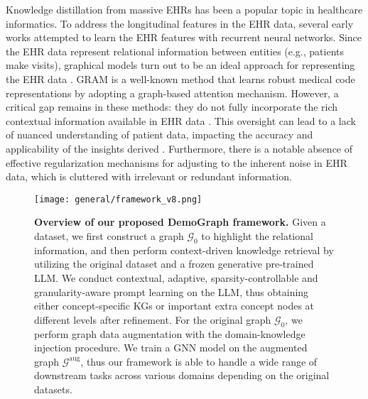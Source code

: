 Knowledge distillation from massive EHRs has been a popular topic in healthcare informatics. 
%
To address the longitudinal features in the EHR data, several early works \citep{ma2017dipole, ma2020concare, ma2020adacare} attempted to learn the EHR features with recurrent neural networks.
%
Since the EHR data represent relational information between entities (e.g., patients make visits), graphical models turn out to be an ideal approach for representing the EHR data \citep{choi2017gram, choi2018mime}.
%
GRAM \citep{choi2017gram} is a well-known method that learns robust medical code representations by adopting a graph-based attention mechanism.
%
However, a critical gap remains in these methods: they do not fully incorporate the rich contextual information available in EHR data \cite{hsu2012context, del2013disseminating}. This oversight can lead to a lack of nuanced understanding of patient data, impacting the accuracy and applicability of the insights derived \cite{evans2016electronic}. 
%
Furthermore, there is a notable absence of effective regularization mechanisms for adjusting to the inherent noise in EHR data, which is cluttered with irrelevant or redundant information.
% 



\begin{figure*}
    \centering
    \texttt{[image: general/framework\_v8.png]}
    \caption{\textbf{Overview of our proposed DemoGraph framework.} \textnormal{Given a dataset, we first construct a 
    graph \( \mathcal{G}_0 \) to highlight the relational information, and
    then perform context-driven knowledge retrieval by utilizing the original dataset and a frozen generative pre-trained LLM. We conduct contextual, adaptive, sparsity-controllable and granularity-aware prompt learning on the LLM, thus obtaining either concept-specific KGs or important extra concept nodes at different levels after refinement. For the original graph \( \mathcal{G}_0 \), we perform graph data augmentation with the domain-knowledge injection procedure. 
    We train a GNN model on the augmented graph \( \mathcal{G}^\text{aug} \), thus our framework is able to handle a wide range of downstream tasks across various domains depending on the original datasets. }}
    \label{fig: framework}
\end{figure*} 

